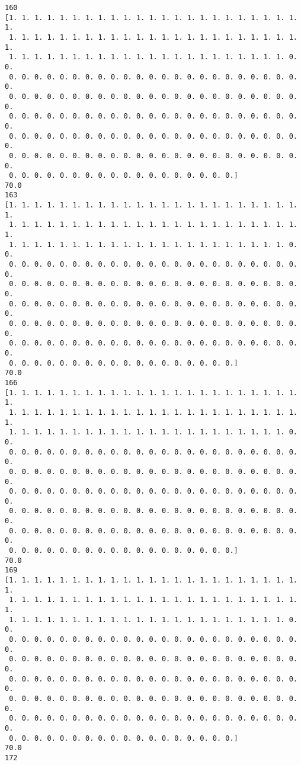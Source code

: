 \documentclass[11pt]{article}
\begin{document}
\begin{Verbatim}[commandchars=\\\{\}]
160
[1. 1. 1. 1. 1. 1. 1. 1. 1. 1. 1. 1. 1. 1. 1. 1. 1. 1. 1. 1. 1. 1. 1. 1.
 1. 1. 1. 1. 1. 1. 1. 1. 1. 1. 1. 1. 1. 1. 1. 1. 1. 1. 1. 1. 1. 1. 1. 1.
 1. 1. 1. 1. 1. 1. 1. 1. 1. 1. 1. 1. 1. 1. 1. 1. 1. 1. 1. 1. 1. 1. 0. 0.
 0. 0. 0. 0. 0. 0. 0. 0. 0. 0. 0. 0. 0. 0. 0. 0. 0. 0. 0. 0. 0. 0. 0. 0.
 0. 0. 0. 0. 0. 0. 0. 0. 0. 0. 0. 0. 0. 0. 0. 0. 0. 0. 0. 0. 0. 0. 0. 0.
 0. 0. 0. 0. 0. 0. 0. 0. 0. 0. 0. 0. 0. 0. 0. 0. 0. 0. 0. 0. 0. 0. 0. 0.
 0. 0. 0. 0. 0. 0. 0. 0. 0. 0. 0. 0. 0. 0. 0. 0. 0. 0. 0. 0. 0. 0. 0. 0.
 0. 0. 0. 0. 0. 0. 0. 0. 0. 0. 0. 0. 0. 0. 0. 0. 0. 0. 0. 0. 0. 0. 0. 0.
 0. 0. 0. 0. 0. 0. 0. 0. 0. 0. 0. 0. 0. 0. 0. 0. 0. 0.]
70.0
163
[1. 1. 1. 1. 1. 1. 1. 1. 1. 1. 1. 1. 1. 1. 1. 1. 1. 1. 1. 1. 1. 1. 1. 1.
 1. 1. 1. 1. 1. 1. 1. 1. 1. 1. 1. 1. 1. 1. 1. 1. 1. 1. 1. 1. 1. 1. 1. 1.
 1. 1. 1. 1. 1. 1. 1. 1. 1. 1. 1. 1. 1. 1. 1. 1. 1. 1. 1. 1. 1. 1. 0. 0.
 0. 0. 0. 0. 0. 0. 0. 0. 0. 0. 0. 0. 0. 0. 0. 0. 0. 0. 0. 0. 0. 0. 0. 0.
 0. 0. 0. 0. 0. 0. 0. 0. 0. 0. 0. 0. 0. 0. 0. 0. 0. 0. 0. 0. 0. 0. 0. 0.
 0. 0. 0. 0. 0. 0. 0. 0. 0. 0. 0. 0. 0. 0. 0. 0. 0. 0. 0. 0. 0. 0. 0. 0.
 0. 0. 0. 0. 0. 0. 0. 0. 0. 0. 0. 0. 0. 0. 0. 0. 0. 0. 0. 0. 0. 0. 0. 0.
 0. 0. 0. 0. 0. 0. 0. 0. 0. 0. 0. 0. 0. 0. 0. 0. 0. 0. 0. 0. 0. 0. 0. 0.
 0. 0. 0. 0. 0. 0. 0. 0. 0. 0. 0. 0. 0. 0. 0. 0. 0. 0.]
70.0
166
[1. 1. 1. 1. 1. 1. 1. 1. 1. 1. 1. 1. 1. 1. 1. 1. 1. 1. 1. 1. 1. 1. 1. 1.
 1. 1. 1. 1. 1. 1. 1. 1. 1. 1. 1. 1. 1. 1. 1. 1. 1. 1. 1. 1. 1. 1. 1. 1.
 1. 1. 1. 1. 1. 1. 1. 1. 1. 1. 1. 1. 1. 1. 1. 1. 1. 1. 1. 1. 1. 1. 0. 0.
 0. 0. 0. 0. 0. 0. 0. 0. 0. 0. 0. 0. 0. 0. 0. 0. 0. 0. 0. 0. 0. 0. 0. 0.
 0. 0. 0. 0. 0. 0. 0. 0. 0. 0. 0. 0. 0. 0. 0. 0. 0. 0. 0. 0. 0. 0. 0. 0.
 0. 0. 0. 0. 0. 0. 0. 0. 0. 0. 0. 0. 0. 0. 0. 0. 0. 0. 0. 0. 0. 0. 0. 0.
 0. 0. 0. 0. 0. 0. 0. 0. 0. 0. 0. 0. 0. 0. 0. 0. 0. 0. 0. 0. 0. 0. 0. 0.
 0. 0. 0. 0. 0. 0. 0. 0. 0. 0. 0. 0. 0. 0. 0. 0. 0. 0. 0. 0. 0. 0. 0. 0.
 0. 0. 0. 0. 0. 0. 0. 0. 0. 0. 0. 0. 0. 0. 0. 0. 0. 0.]
70.0
169
[1. 1. 1. 1. 1. 1. 1. 1. 1. 1. 1. 1. 1. 1. 1. 1. 1. 1. 1. 1. 1. 1. 1. 1.
 1. 1. 1. 1. 1. 1. 1. 1. 1. 1. 1. 1. 1. 1. 1. 1. 1. 1. 1. 1. 1. 1. 1. 1.
 1. 1. 1. 1. 1. 1. 1. 1. 1. 1. 1. 1. 1. 1. 1. 1. 1. 1. 1. 1. 1. 1. 0. 0.
 0. 0. 0. 0. 0. 0. 0. 0. 0. 0. 0. 0. 0. 0. 0. 0. 0. 0. 0. 0. 0. 0. 0. 0.
 0. 0. 0. 0. 0. 0. 0. 0. 0. 0. 0. 0. 0. 0. 0. 0. 0. 0. 0. 0. 0. 0. 0. 0.
 0. 0. 0. 0. 0. 0. 0. 0. 0. 0. 0. 0. 0. 0. 0. 0. 0. 0. 0. 0. 0. 0. 0. 0.
 0. 0. 0. 0. 0. 0. 0. 0. 0. 0. 0. 0. 0. 0. 0. 0. 0. 0. 0. 0. 0. 0. 0. 0.
 0. 0. 0. 0. 0. 0. 0. 0. 0. 0. 0. 0. 0. 0. 0. 0. 0. 0. 0. 0. 0. 0. 0. 0.
 0. 0. 0. 0. 0. 0. 0. 0. 0. 0. 0. 0. 0. 0. 0. 0. 0. 0.]
70.0
172

\end{Verbatim}
\end{document}
